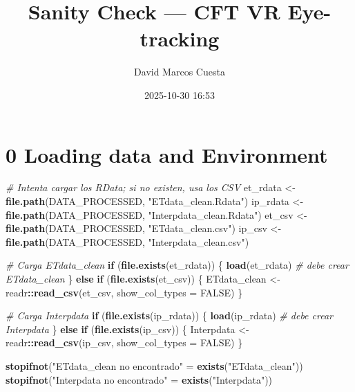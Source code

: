 \documentclass[
]{article}
\title{Sanity Check --- CFT VR Eye-tracking}
\author{David Marcos Cuesta}
\date{2025-10-30 16:53}
\newenvironment{Shaded}{\begin{snugshade}}{\end{snugshade}}
\newcommand{\AttributeTok}[1]{\textcolor[rgb]{0.13,0.29,0.53}{#1}}
\newcommand{\CommentTok}[1]{\textcolor[rgb]{0.56,0.35,0.01}{\textit{#1}}}
\newcommand{\ConstantTok}[1]{\textcolor[rgb]{0.56,0.35,0.01}{#1}}
\newcommand{\ControlFlowTok}[1]{\textcolor[rgb]{0.13,0.29,0.53}{\textbf{#1}}}
\newcommand{\FunctionTok}[1]{\textcolor[rgb]{0.13,0.29,0.53}{\textbf{#1}}}
\newcommand{\NormalTok}[1]{#1}
\newcommand{\OtherTok}[1]{\textcolor[rgb]{0.56,0.35,0.01}{#1}}
\newcommand{\SpecialCharTok}[1]{\textcolor[rgb]{0.81,0.36,0.00}{\textbf{#1}}}
\newcommand{\StringTok}[1]{\textcolor[rgb]{0.31,0.60,0.02}{#1}}
\begin{document}
\maketitle

{
\setcounter{tocdepth}{2}
\tableofcontents
}
\section{0 Loading data and
Environment}\label{loading-data-and-environment}

\begin{Shaded}
\begin{Highlighting}[]
\CommentTok{\# Intenta cargar los RData; si no existen, usa los CSV}
\NormalTok{et\_rdata }\OtherTok{\textless{}{-}} \FunctionTok{file.path}\NormalTok{(DATA\_PROCESSED, }\StringTok{"ETdata\_clean.Rdata"}\NormalTok{)}
\NormalTok{ip\_rdata }\OtherTok{\textless{}{-}} \FunctionTok{file.path}\NormalTok{(DATA\_PROCESSED, }\StringTok{"Interpdata\_clean.Rdata"}\NormalTok{)}
\NormalTok{et\_csv   }\OtherTok{\textless{}{-}} \FunctionTok{file.path}\NormalTok{(DATA\_PROCESSED, }\StringTok{"ETdata\_clean.csv"}\NormalTok{)}
\NormalTok{ip\_csv   }\OtherTok{\textless{}{-}} \FunctionTok{file.path}\NormalTok{(DATA\_PROCESSED, }\StringTok{"Interpdata\_clean.csv"}\NormalTok{)}

\CommentTok{\# Carga ETdata\_clean}
\ControlFlowTok{if}\NormalTok{ (}\FunctionTok{file.exists}\NormalTok{(et\_rdata)) \{}
  \FunctionTok{load}\NormalTok{(et\_rdata)  }\CommentTok{\# debe crear ETdata\_clean}
\NormalTok{\} }\ControlFlowTok{else} \ControlFlowTok{if}\NormalTok{ (}\FunctionTok{file.exists}\NormalTok{(et\_csv)) \{}
\NormalTok{  ETdata\_clean }\OtherTok{\textless{}{-}}\NormalTok{ readr}\SpecialCharTok{::}\FunctionTok{read\_csv}\NormalTok{(et\_csv, }\AttributeTok{show\_col\_types =} \ConstantTok{FALSE}\NormalTok{)}
\NormalTok{\}}

\CommentTok{\# Carga Interpdata}
\ControlFlowTok{if}\NormalTok{ (}\FunctionTok{file.exists}\NormalTok{(ip\_rdata)) \{}
  \FunctionTok{load}\NormalTok{(ip\_rdata)  }\CommentTok{\# debe crear Interpdata}
\NormalTok{\} }\ControlFlowTok{else} \ControlFlowTok{if}\NormalTok{ (}\FunctionTok{file.exists}\NormalTok{(ip\_csv)) \{}
\NormalTok{  Interpdata }\OtherTok{\textless{}{-}}\NormalTok{ readr}\SpecialCharTok{::}\FunctionTok{read\_csv}\NormalTok{(ip\_csv, }\AttributeTok{show\_col\_types =} \ConstantTok{FALSE}\NormalTok{)}
\NormalTok{\}}

\FunctionTok{stopifnot}\NormalTok{(}\StringTok{"ETdata\_clean no encontrado"} \OtherTok{=} \FunctionTok{exists}\NormalTok{(}\StringTok{"ETdata\_clean"}\NormalTok{))}
\FunctionTok{stopifnot}\NormalTok{(}\StringTok{"Interpdata no encontrado"}   \OtherTok{=} \FunctionTok{exists}\NormalTok{(}\StringTok{"Interpdata"}\NormalTok{))}


\end{Highlighting}
\end{Shaded}
\end{document}
